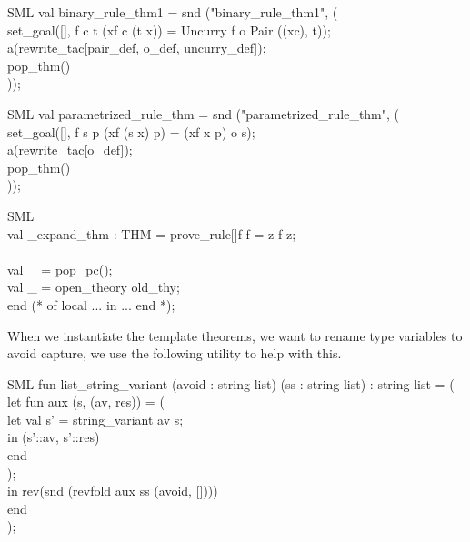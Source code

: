\documentclass[11pt,a4paper]{article}
\begin{document}
\begin{GFT}{SML}
\+val \PrNL{}binary\_rule\_thm1\PrNN{} = snd ("binary\_rule\_thm1", (\\
\+set\_goal([], \PrKM{} \PrLF{}f c t\PrLH{} (\PrMM{}x\PrLH{}f c (t x)) = Uncurry f o Pair ((\PrMM{}x\PrLH{}c), t)\PrKO{});\\
\+a(rewrite\_tac[pair\_def, o\_def, uncurry\_def]);\\
\+pop\_thm()\\
\+));\\
\end{GFT}
\begin{GFT}{SML}
\+val \PrNL{}parametrized\_rule\_thm\PrNN{} = snd ("parametrized\_rule\_thm", (\\
\+set\_goal([], \PrKM{} \PrLF{}f s p\PrLH{} (\PrMM{}x\PrLH{}f (s x) p) = (\PrMM{}x\PrLH{}f x p) o s\PrKO{});\\
\+a(rewrite\_tac[o\_def]);\\
\+pop\_thm()\\
\+));\\
\end{GFT}
\begin{GFT}{SML}
\+\\
\+val \PrMI{}\_expand\_thm : THM = prove\_rule[]\PrKM{}\PrLF{}f\PrLH{} f = \PrMM{}z\PrLH{} f z\PrKO{};\\
\+\\
\+val \_ = pop\_pc();\\
\+val \_ = open\_theory old\_thy;\\
\+end (* of local ... in ... end *);\\
\end{GFT}
When we instantiate the template theorems, we want to rename type variables to avoid capture, we use the following utility to help with this.
\begin{GFT}{SML}
\+fun \PrNL{}list\_string\_variant\PrNN{} (avoid : string list) (ss : string list) : string list = (\\
\+	let	fun aux (s, (av, res)) = (\\
\+			let	val s' = string\_variant av s;\\
\+			in	(s'::av, s'::res)\\
\+			end\\
\+		);\\
\+	in	rev(snd (revfold aux ss (avoid, [])))\\
\+	end\\
\+);\\
\end{GFT}
\end{document}

